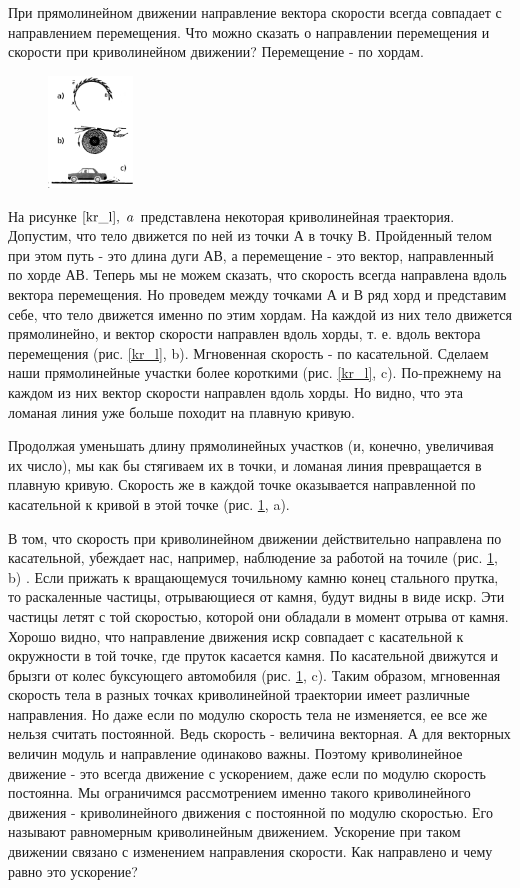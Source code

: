 \documentclass[a5paper, 10pt]{diss_4}
\renewcommand{\'}{\,'}
\begin{document}
  При прямолинейном движении направление вектора скорости всегда
совпадает с направлением перемещения. Что можно сказать о направлении
перемещения и скорости при криволинейном движении? Перемещение - по хордам.

\begin{figure}
\includegraphics[width=0.2\textwidth]{img/img19.eps}
\caption{}
\label{ps_kl}
\end{figure}
  На рисунке $\ref{kr_l},\ a$ представлена некоторая криволинейная траектория.
Допустим, что тело движется по ней из точки А в точку В. Пройденный телом при
этом путь - это длина дуги АВ, а перемещение - это вектор, направленный по
хорде АВ. Теперь мы не можем сказать, что скорость всегда направлена вдоль
вектора перемещения. Но проведем между точками А и В ряд хорд и представим
себе, что тело движется именно по этим хордам. На каждой из них тело движется
прямолинейно, и вектор скорости направлен вдоль хорды, т. е. вдоль вектора
перемещения (рис. \ref{kr_l}, b). Мгновенная скорость - по касательной. Сделаем наши
 прямолинейные участки более короткими (рис. \ref{kr_l}, c). По-прежнему на каждом из
них вектор скорости направлен вдоль хорды. Но видно, что эта ломаная линия уже
больше походит на плавную кривую.

  Продолжая уменьшать длину прямолинейных участков (и, конечно,
увеличивая их число), мы как бы стягиваем их в точки, и ломаная линия
превращается в плавную кривую. Скорость же в каждой точке оказывается
направленной по касательной к кривой в этой точке (рис. \ref{ps_kl}, a).

  В том, что скорость при криволинейном движении действительно направлена
по касательной, убеждает нас, например, наблюдение за работой на точиле (рис. \ref{ps_kl}, b)
. Если прижать к вращающемуся точильному камню конец стального прутка, то
раскаленные частицы, отрывающиеся от камня, будут видны в виде искр. Эти
частицы летят с той скоростью, которой они обладали в момент отрыва от камня.
Хорошо видно, что направление движения искр совпадает с касательной к
окружности в той точке, где пруток касается камня. По касательной движутся и
брызги от колес буксующего автомобиля (рис. \ref{ps_kl}, c). Таким образом, мгновенная
скорость тела в разных точках криволинейной траектории имеет различные
направления. Но даже если по модулю скорость
тела не изменяется, ее все же нельзя считать постоянной. Ведь скорость -
величина векторная. А для векторных величин модуль и направление одинаково
важны. Поэтому криволинейное движение - это всегда движение с ускорением, даже
если по модулю скорость постоянна. Мы ограничимся рассмотрением именно такого
криволинейного движения - криволинейного движения с постоянной по модулю
скоростью. Его называют равномерным криволинейным движением. Ускорение при
таком движении связано с изменением направления скорости. Как направлено и чему
равно это ускорение?
\end{document}
